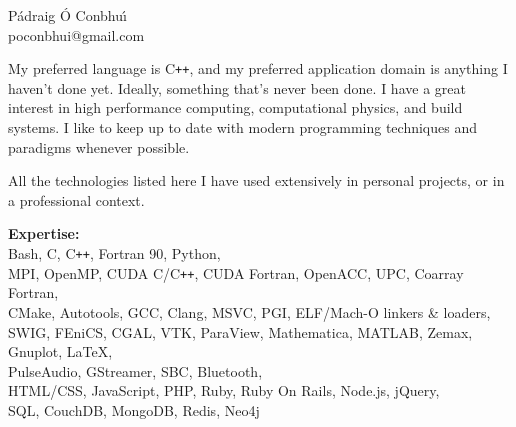 \documentclass[11pt]{article}
\newcommand{\resumeSection}[1]{
    \par
    \large {\sc {#1}}
    \par
    \vspace{-0.9\baselineskip}
    \hrulefill
    \vspace{0.25\baselineskip}
    \par
}
\newenvironment{resumeSubSectionBody}{
    \par
    \vspace{-0.2\parskip}
    \begin{small}
    \par
} {
    \par
    \end{small}
    \par
}
\newenvironment{resumeDescription}{
    \vspace{-0.5\baselineskip}
    \begin{description}
} {
    \end{description}
}
\begin{document}


%
%
\begin{center}
    { \huge \textbf \sc P\'adraig \'O Conbhu\'\i } \\
    poconbhui@gmail.com
\end{center}




\resumeSection{Software Development}


%
%
\begin{resumeSubSectionBody}

    My preferred language is C\verb!++!, and my preferred application domain is
    anything I haven't done yet.
    Ideally, something that's never been done.
    I have a great interest in high performance computing, computational
    physics, and build systems.
    I like to keep up to date with modern programming techniques and paradigms
    whenever possible.

    All the technologies listed here I have used extensively in personal
    projects, or in a professional context.

    \begin{resumeDescription}
        \item{\bf Expertise:} \\
            Bash, C, C\verb!++!, Fortran 90, Python,
            \\
            MPI, OpenMP, CUDA C/C\verb!++!, CUDA Fortran,
            OpenACC, UPC, Coarray Fortran,
            \\
            CMake, Autotools, GCC, Clang, MSVC, PGI, ELF/Mach-O linkers \& loaders,
            \\
            SWIG, FEniCS, CGAL, VTK, ParaView,
            Mathematica, MATLAB, Zemax, Gnuplot, LaTeX,
            \\
            PulseAudio, GStreamer, SBC, Bluetooth,
            \\
            HTML/CSS, JavaScript, PHP, Ruby,
            Ruby On Rails, Node.js, jQuery,
            \\
            SQL, CouchDB, MongoDB, Redis, Neo4j
    \end{resumeDescription}

\end{resumeSubSectionBody}
\end{document}
